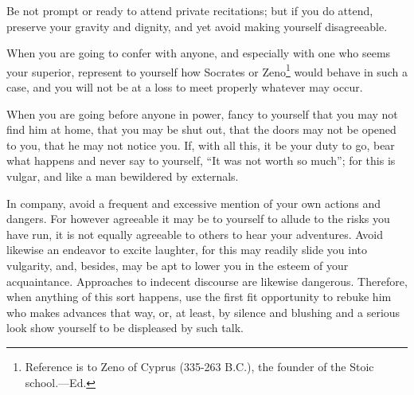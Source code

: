 Be not prompt or ready to attend private recitations; but if you do
attend, preserve your gravity and dignity, and yet avoid making yourself
disagreeable.

When you are going to confer with anyone, and especially with one who
seems your superior, represent to yourself how Socrates or Zeno\footnote{Reference is to Zeno of Cyprus (335-263 B.C.), the founder of the Stoic school.---Ed.} would
behave in such a case, and you will not be at a loss to meet properly
whatever may occur.

When you are going before anyone in power, fancy to yourself that you may
not find him at home, that you may be shut out, that the doors may not be
opened to you, that he may not notice you. If, with all this, it be your
duty to go, bear what happens and never say to yourself, ``It was not
worth so much''; for this is vulgar, and like a man bewildered by
externals.

In company, avoid a frequent and excessive mention of your own actions
and dangers. For however agreeable it may be to yourself to allude to the
risks you have run, it is not equally agreeable to others to hear your
adventures. Avoid likewise an endeavor to excite laughter, for this may
readily slide you into vulgarity, and, besides, may be apt to lower you
in the esteem of your acquaintance. Approaches to indecent discourse are
likewise dangerous. Therefore, when anything of this sort happens, use
the first fit opportunity to rebuke him who makes advances that way, or,
at least, by silence and blushing and a serious look show yourself to be
displeased by such talk.
